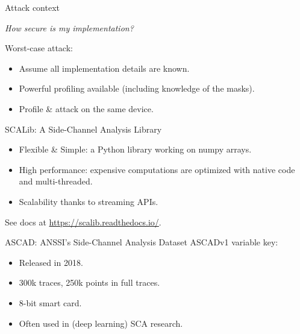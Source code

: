 \documentclass[aspectratio=169]{beamer}
\begin{document}
\begin{frame}{Attack context}
    \begin{center}
        \emph{How secure is my implementation?}
    \end{center}

    Worst-case attack:
    \begin{itemize}
        \item Assume all implementation details are known.
        \item Powerful profiling available (including knowledge of the masks).
        \item Profile \& attack on the same device.
    \end{itemize}
\end{frame}

\begin{frame}{SCALib: A Side-Channel Analysis Library}
    \begin{itemize}
        \item Flexible \& Simple: a Python library working on numpy arrays.
        \item High performance: expensive computations are optimized with native code and multi-threaded.
        \item Scalability thanks to streaming APIs.
    \end{itemize}
    \begin{center}
        See docs at \url{https://scalib.readthedocs.io/}.
    \end{center}
\end{frame}

\begin{frame}{ASCAD: ANSSI's Side-Channel Analysis Dataset}
    ASCADv1 variable key:
    \begin{itemize}
        \item Released in 2018.
        \item 300k traces, 250k points in full traces.
        \item 8-bit smart card.
        \item Often used in (deep learning) SCA research.
    \end{itemize}
\end{frame}
\end{document}
